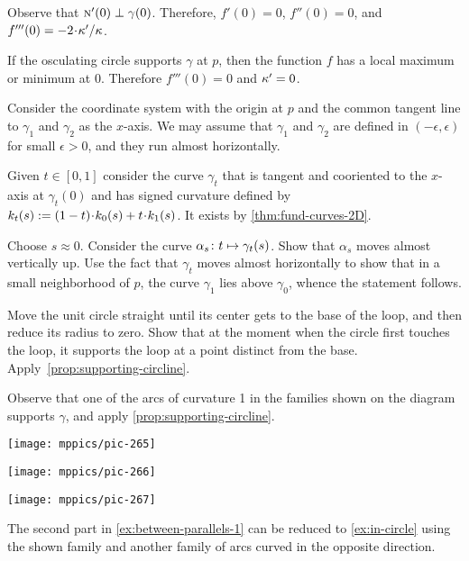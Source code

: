 \begin{multicols}{2}
Observe that $\text{\sc{n}}'(0)\perp\gamma(0)$.
Therefore, $f'(0)=0$, $f''(0)=0$, and $f'''(0)\z=-2\cdot\kur'/\kur$.

If the osculating circle supports $\gamma$ at $p$,
then the function $f$ has a local maximum or minimum at $0$.
Therefore $f'''(0)=0$ and $\kappa'=0$.

Consider the coordinate system with the origin at $p$ and the common tangent line to $\gamma_1$ and $\gamma_2$ as the $x$-axis.
We may assume that $\gamma_1$ and $\gamma_2$ are defined in $(-\epsilon,\epsilon)$ for small $\epsilon>0$,
and they run almost horizontally.

Given $t\in[0,1]$ consider the curve $\gamma_t$ that is tangent and cooriented to the $x$-axis at $\gamma_t(0)$ and has signed curvature defined by $\skur_t(s)\z\df(1\z-t)\cdot\skur_0(s)+t\cdot\skur_1(s)$.
It exists by \ref{thm:fund-curves-2D}.

Choose $s\approx 0$.
Consider the curve $\alpha_s\:t\z\mapsto \gamma_t(s)$.
Show that $\alpha_s$ moves almost vertically up.
Use the fact that $\gamma_t$ moves almost horizontally to show that in a small neighborhood of $p$, the curve $\gamma_1$ lies above $\gamma_0$,
whence the statement follows.

Move the unit circle straight until its center gets to the base of the loop,
and then reduce its radius to zero.
Show that at the moment when the circle first touches the loop, it supports the loop at a point distinct from the base.
Apply~\ref{prop:supporting-circline}.


Observe that one of the arcs of curvature 1 in the families shown on the diagram supports $\gamma$, and apply \ref{prop:supporting-circline}.

\begin{Figure}
\begin{minipage}{.35\textwidth}
\centering
\texttt{[image: mppics/pic-265]}
\end{minipage}
\hfill
\begin{minipage}{.3\textwidth}
\centering
\texttt{[image: mppics/pic-266]}
\end{minipage}
\hfill
\begin{minipage}{.25\textwidth}
\centering
\texttt{[image: mppics/pic-267]}
\end{minipage}
\end{Figure}

The second part in \ref{ex:between-parallels-1} can be reduced to \ref{ex:in-circle} using the shown family and another family of arcs curved in the opposite direction.


\end{multicols}
